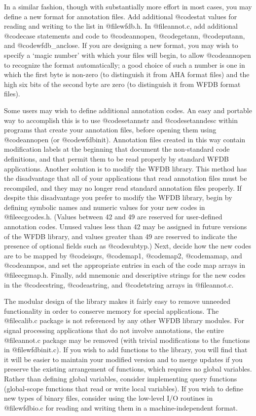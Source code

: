 {{{{{{{{In a similar fashion, though with substantially more effort in most
cases, you may define a new format for annotation files.  Add additional
@code{stat} values for reading and writing to the list in @file{wfdb.h}.
In @file{annot.c}, add additional @code{case} statements and code to
@code{annopen}, @code{getann}, @code{putann}, and @code{wfdb_anclose}.  If
you are designing a new format, you may wish to specify a `magic number'
with which your files will begin, to allow @code{annopen} to recognize
the format automatically; a good choice of such a number is one in which
the first byte is non-zero (to distinguish it from AHA format files) and
the high six bits of the second byte are zero (to distinguish it from WFDB
format files).

Some users may wish to define additional annotation codes.  An easy and
portable way to accomplish this is to use @code{setannstr} and
@code{setanndesc} within programs that create your annotation files,
before opening them using @code{annopen} (or @code{wfdbinit}).  Annotation
files created in this way contain modification labels at the beginning
that document the non-standard code definitions, and that permit them to
be read properly by standard WFDB applications.  Another solution is to
modify the WFDB library.  This method has the disadvantage that all of
your applications that read annotation files must be recompiled, and
they may no longer read standard annotation files properly.  If despite
this disadvantage you prefer to modify the WFDB library, begin by defining
symbolic names and numeric values for your new codes in
@file{ecgcodes.h}.  (Values between 42 and 49 are reserved for
user-defined annotation codes.  Unused values less than 42 may be
assigned in future versions of the WFDB library, and values greater than
49 are reserved to indicate the presence of optional fields such as
@code{subtyp}.)  Next, decide how the new codes are to be mapped by
@code{isqrs}, @code{map1}, @code{map2}, @code{mamap}, and @code{annpos},
and set the appropriate entries in each of the code map arrays in
@file{ecgmap.h}.  Finally, add mnemonic and descriptive strings for the
new codes in the @code{cstring}, @code{astring}, and @code{tstring}
arrays in @file{annot.c}.

The modular design of the library makes it fairly easy to remove
unneeded functionality in order to conserve memory for special
applications.  The @file{calib.c} package is not referenced by any other
WFDB library modules.  For signal processing applications that do not involve
annotations, the entire @file{annot.c} package may be removed (with trivial
modifications to the functions in @file{wfdbinit.c}).  If you wish to add
functions to the library, you will find that it will be easier to
maintain your modified version and to merge updates if you preserve the
existing arrangement of functions, which requires no global variables.
Rather than defining global variables, consider implementing query
functions (global-scope functions that read or write local
variables).  If you wish to define new types of binary files, consider
using the low-level I/O routines in @file{wfdbio.c} for reading and writing
them in a machine-independent format.

}}}}}}}}
